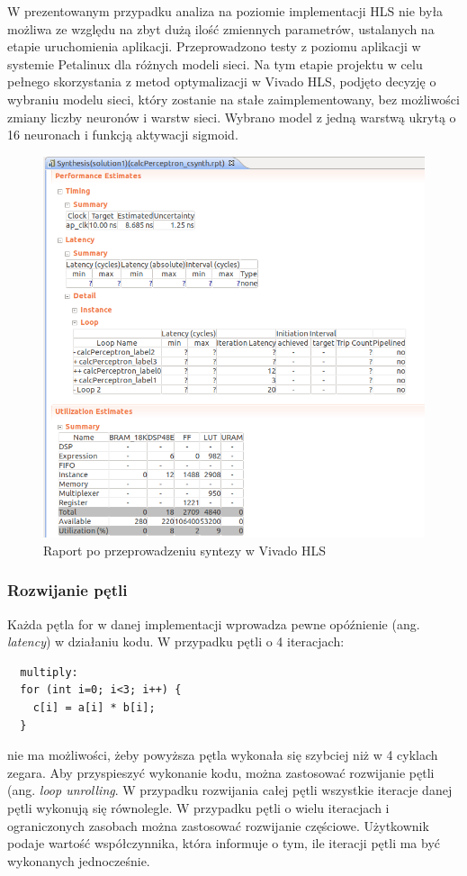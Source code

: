 W prezentowanym przypadku analiza na poziomie implementacji HLS nie była możliwa ze względu na zbyt dużą ilość zmiennych parametrów, ustalanych na etapie uruchomienia aplikacji. Przeprowadzono testy z poziomu aplikacji w systemie Petalinux dla różnych modeli sieci. Na tym etapie projektu w celu pełnego skorzystania z metod optymalizacji w Vivado HLS, podjęto decyzję o wybraniu modelu sieci, który zostanie na stałe zaimplementowany, bez możliwości zmiany liczby neuronów i warstw sieci. Wybrano model z jedną warstwą ukrytą o 16 neuronach i funkcją aktywacji sigmoid.


\begin{figure}[!h]
  \centering
  \includegraphics[width=\textwidth]{img/hls-report.png}
  \caption{Raport po przeprowadzeniu syntezy w Vivado HLS}
  \label{hls-report}
\end{figure}


\subsubsection{Rozwijanie pętli}

Każda pętla for w danej implementacji wprowadza pewne opóźnienie (ang. \emph{latency}) w działaniu kodu. W przypadku pętli o 4 iteracjach:
\begin{verbatim}
  multiply:
  for (int i=0; i<3; i++) {
    c[i] = a[i] * b[i];
  }
\end{verbatim}
nie ma możliwości, żeby powyższa pętla wykonała się szybciej niż w 4 cyklach zegara. Aby przyspieszyć wykonanie kodu, można zastosować rozwijanie pętli (ang. \emph{loop unrolling}. W przypadku rozwijania całej pętli wszystkie iteracje danej pętli wykonują się równolegle. W przypadku pętli o wielu iteracjach i ograniczonych zasobach można zastosować rozwijanie częściowe. Użytkownik podaje wartość współczynnika, która informuje o tym, ile iteracji pętli ma być wykonanych jednocześnie.


